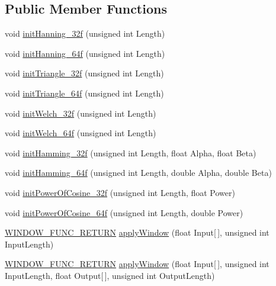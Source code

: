 \subsection*{Public Member Functions}
\begin{DoxyCompactItemize}
\item 
void \hyperlink{class_window_functions_a773581cc56cc14bbda59c8ead7f3603b}{init\+Hanning\+\_\+32f} (unsigned int Length)
\item 
void \hyperlink{class_window_functions_a1a9dc2251451dcb466e292f8f77a3f22}{init\+Hanning\+\_\+64f} (unsigned int Length)
\item 
void \hyperlink{class_window_functions_a73fb733c29dd2bccba6f4a385f404895}{init\+Triangle\+\_\+32f} (unsigned int Length)
\item 
void \hyperlink{class_window_functions_a105b7b0542348f533bc653f933600c99}{init\+Triangle\+\_\+64f} (unsigned int Length)
\item 
void \hyperlink{class_window_functions_ae7f9c4ed76132771c367f98d09c24b79}{init\+Welch\+\_\+32f} (unsigned int Length)
\item 
void \hyperlink{class_window_functions_a0cf5a74cf6185ab9c50513cecc185d84}{init\+Welch\+\_\+64f} (unsigned int Length)
\item 
void \hyperlink{class_window_functions_a8c0c60524b6dda82bdeb122a9d97cc69}{init\+Hamming\+\_\+32f} (unsigned int Length, float Alpha, float Beta)
\item 
void \hyperlink{class_window_functions_a82257be842bb63463a9e58c424ec8a79}{init\+Hamming\+\_\+64f} (unsigned int Length, double Alpha, double Beta)
\item 
void \hyperlink{class_window_functions_a14b9934352808de84c563e3d888d65bc}{init\+Power\+Of\+Cosine\+\_\+32f} (unsigned int Length, float Power)
\item 
void \hyperlink{class_window_functions_a3b9af9a72491c1ebb8d47d17de446c9d}{init\+Power\+Of\+Cosine\+\_\+64f} (unsigned int Length, double Power)
\item 
\hyperlink{class_window_functions_a0307e2e5d044d1f81410766ac035fd3f}{W\+I\+N\+D\+O\+W\+\_\+\+F\+U\+N\+C\+\_\+\+R\+E\+T\+U\+RN} \hyperlink{class_window_functions_a93c77058ff5d86ea60e73b6cbecf0ec0}{apply\+Window} (float Input\mbox{[}$\,$\mbox{]}, unsigned int Input\+Length)
\item 
\hyperlink{class_window_functions_a0307e2e5d044d1f81410766ac035fd3f}{W\+I\+N\+D\+O\+W\+\_\+\+F\+U\+N\+C\+\_\+\+R\+E\+T\+U\+RN} \hyperlink{class_window_functions_a9e5b8accbd50374fa0431955812acc78}{apply\+Window} (float Input\mbox{[}$\,$\mbox{]}, unsigned int Input\+Length, float Output\mbox{[}$\,$\mbox{]}, unsigned int Output\+Length)

\end{DoxyCompactItemize}
